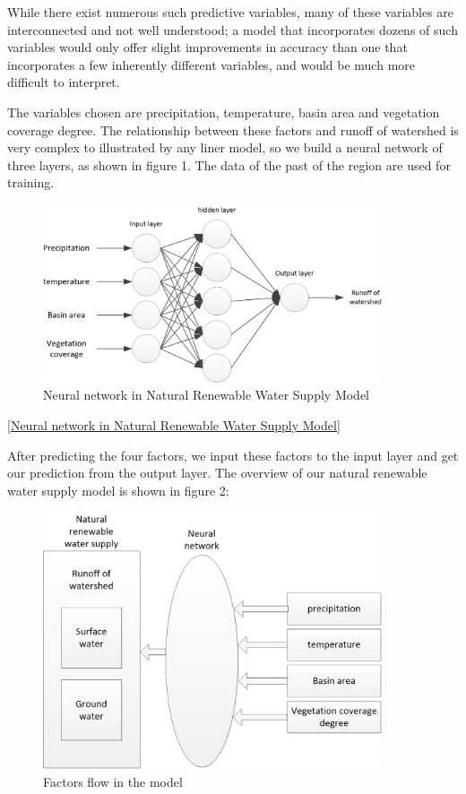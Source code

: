 \documentclass{mcmthesis}
\begin{document}
While there exist numerous such predictive variables, many of these variables are interconnected and not well understood; a model that incorporates dozens of such variables would only offer slight improvements in accuracy than one that incorporates a few inherently different variables, and would be much more difficult to interpret.

The variables chosen are precipitation, temperature, basin area and vegetation coverage degree. The relationship between these factors and runoff of watershed is very complex to illustrated by any liner model, so we build a neural network of three layers, as shown in figure 1. The data of the past of the region are used for training. 
\begin{figure}[h]
	\small
	\centering
	\includegraphics[width=10cm]{neural.jpg}
	\caption{Neural network in Natural Renewable Water Supply Model} \label{fig:Neural network in Natural Renewable Water Supply Model}
\end{figure}


\eqref{Neural network in Natural Renewable Water Supply Model}

After predicting the four factors, we input these factors to the input layer and get our prediction from the output layer. The overview of our natural renewable water supply model is shown in figure 2:

\begin{figure}[h]
	\small
	\centering
	\includegraphics[width=10cm]{modelnatural.jpg}
	\caption{Factors flow in the model} \label{fig:bb}
\end{figure}
\end{document}
